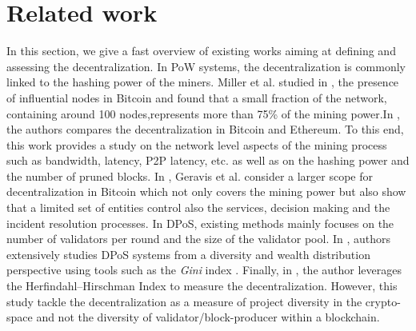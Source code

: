 \documentclass{article}
\begin{document}
\section{Related work}
In this section, we give a fast overview of existing works aiming at defining and assessing the decentralization. In PoW systems, the decentralization is commonly linked to the hashing power of the miners. Miller et al. studied in \cite{miller2015discovering}, the presence of influential nodes in Bitcoin and found that a small fraction of the network, containing around 100 nodes,represents more than 75\% of the mining power.In \cite{gencer2018decentralization}, the authors compares the decentralization in Bitcoin and Ethereum. To this end, this work provides a study on the network level aspects of the mining process such as bandwidth, latency, P2P latency, etc. as well as on the hashing power and the number of pruned blocks.   In \cite{gervais2014bitcoin}, Geravis et al. consider a larger scope for decentralization in Bitcoin which not only covers the mining power but also show that a limited set of entities control also the services, decision making and the incident resolution  processes. In DPoS, existing methods mainly focuses on the number of validators per round and the size of the validator pool. In \cite{kwon2019impossibility}, authors extensively studies DPoS systems from a diversity and wealth distribution perspective using tools such as the \textit{Gini} index . Finally, in \cite{DecentralizationCrypto}, the author leverages the Herfindahl–Hirschman Index\cite{rhoades1993herfindahl} to measure the decentralization. However, this study tackle the decentralization as a measure of project diversity in the crypto-space and not the diversity of validator/block-producer within a blockchain.   
\end{document}
